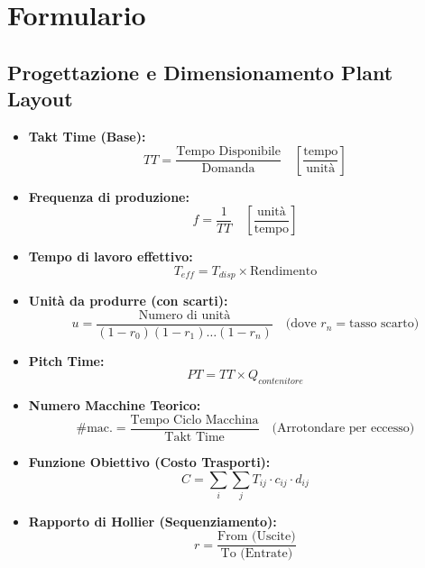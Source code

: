 \section*{Formulario}

\subsection*{Progettazione e Dimensionamento Plant Layout}
\begin{itemize}
    \item \textbf{Takt Time (Base):}
          \[
              TT = \frac{\text{Tempo Disponibile}}{\text{Domanda}} \quad \left[\frac{\text{tempo}}{\text{unità}}\right]
          \]

    \item \textbf{Frequenza di produzione:}
          \[
              f = \frac{1}{TT} \quad \left[\frac{\text{unità}}{\text{tempo}}\right]
          \]

    \item \textbf{Tempo di lavoro effettivo:}
          \[
              T_{eff} = T_{disp} \times \text{Rendimento}
          \]

    \item \textbf{Unità da produrre (con scarti):}
          \[
              u = \frac{\text{Numero di unità}}{(1-r_{0})(1-r_{1}) \dots (1-r_{n})} \quad \text{(dove } r_n = \text{tasso scarto)}
          \]

    \item \textbf{Pitch Time:}
          \[
              PT = TT \times Q_{contenitore}
          \]

    \item \textbf{Numero Macchine Teorico:}
          \[
              \#{\text{mac.}} =\frac{\text{Tempo Ciclo Macchina}}{\text{Takt Time}} \quad \text{(Arrotondare per eccesso)}
          \]

    \item \textbf{Funzione Obiettivo (Costo Trasporti):}
          \[
              C = \sum_{i} \sum_{j} T_{ij} \cdot c_{ij} \cdot d_{ij}
          \]

    \item \textbf{Rapporto di Hollier (Sequenziamento):}
          \[
              r = \frac{\text{From (Uscite)}}{\text{To (Entrate)}}
          \]
\end{itemize}

